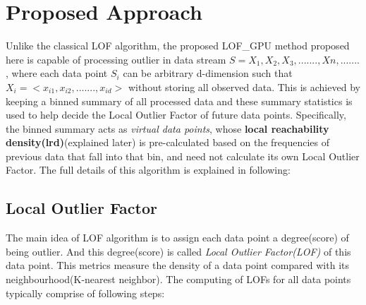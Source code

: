 \documentclass[11pt]{article}       %
\begin{document}
\section{Proposed Approach} \label{proapp}

Unlike the classical LOF algorithm, the proposed LOF\_GPU method proposed here is capable of processing outlier in data stream $S = {X_1, X_2, X_3, ......., Xn, .......}$, where each data point $S_i$ can be arbitrary d-dimension such that $X_i = <x_{i1}, x_{i2}, ......., x_{id}>$ without storing all observed data. This is achieved by keeping a binned summary of all processed data and these summary statistics is used to help decide the Local Outlier Factor of future data points. Specifically, the binned summary acts as \textit{virtual data points}, whose \textbf{local reachability density(lrd)}(explained later) is pre-calculated based on the frequencies of previous data that fall into that bin, and need not calculate its own Local Outlier Factor. The full details of this algorithm is explained in following:

\subsection{Local Outlier Factor} \label{subsect1}

The main idea of LOF algorithm is to assign each data point a degree(score) of being outlier. And this degree(score) is called \textit{Local Outlier Factor(LOF)} of this data point. This metrics measure the density of a data point compared with its neighbourhood(K-nearest neighbor). The computing of LOFs for all data points typically comprise of following steps\cite{Breunig:2000:LID:342009.335388}:
\end{document}
